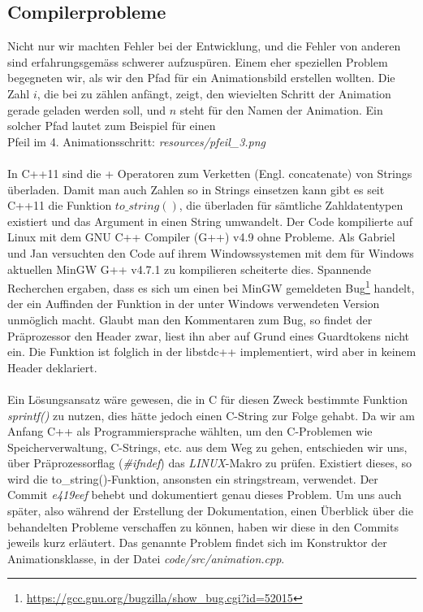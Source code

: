 \documentclass[12pt,a4paper]{scrartcl}
\begin{document}
\subsection{Compilerprobleme}
Nicht nur wir machten Fehler bei der Entwicklung, und die Fehler von anderen sind erfahrungsgemäss schwerer aufzuspüren.
Einem eher speziellen Problem begegneten wir, als wir den Pfad für ein Animationsbild erstellen wollten.
Die Zahl $i$, die bei zu zählen anfängt, zeigt, den wievielten Schritt der Animation gerade geladen werden soll, und $n$ steht für den Namen der Animation.
Ein solcher Pfad lautet zum Beispiel für einen\\Pfeil im 4. Animationsschritt: \textit{resources/pfeil\_3.png}\\
\\
In C++11 sind die + Operatoren zum Verketten (Engl. concatenate) von Strings überladen. Damit man auch Zahlen so in Strings einsetzen
kann gibt es seit C++11 die Funktion $to\_string()$, die überladen für sämtliche Zahldatentypen existiert und das Argument in einen String
umwandelt. Der Code kompilierte auf Linux mit dem GNU C++ Compiler (G++) v4.9 ohne Probleme. Als Gabriel und Jan versuchten den Code auf ihrem Windowssystemen
mit dem für Windows aktuellen MinGW G++ v4.7.1 zu kompilieren scheiterte dies. Spannende Recherchen ergaben, dass es sich um einen bei MinGW
gemeldeten Bug\footnote{\url{https://gcc.gnu.org/bugzilla/show_bug.cgi?id=52015}} handelt, der ein Auffinden der Funktion in der unter Windows verwendeten
Version unmöglich macht. Glaubt man den Kommentaren zum Bug, so findet der Präprozessor den Header zwar, liest ihn aber auf Grund eines Guardtokens nicht ein.
Die Funktion ist folglich in der libstdc++ implementiert, wird aber in keinem Header deklariert.\\ %
\\
Ein Lösungsansatz wäre gewesen, die in C für diesen Zweck bestimmte Funktion \textit{sprintf()} zu nutzen, dies hätte jedoch einen C-String zur Folge gehabt.
Da wir am Anfang C++ als Programmiersprache wählten, um den C-Problemen wie Speicherverwaltung, C-Strings, etc. aus dem Weg zu gehen, entschieden wir uns, über
Präprozessorflag (\textit{\#ifndef}) das \textit{LINUX}-Makro zu prüfen. Existiert dieses, so wird die to\_string()-Funktion, ansonsten ein stringstream, verwendet.
Der Commit \textit{e419eef} behebt und dokumentiert genau dieses Problem. Um uns auch später, also während der Erstellung der Dokumentation, einen Überblick
über die behandelten Probleme verschaffen zu können, haben wir diese in den Commits jeweils kurz erläutert. Das genannte Problem findet sich im
Konstruktor der Animationsklasse, in der Datei \textit{code/src/animation.cpp}.
\end{document}
